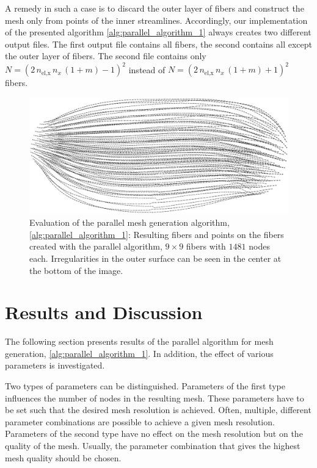 A remedy in such a case is to discard the outer layer of fibers and construct the mesh only from points of the inner streamlines.
Accordingly, our implementation of the presented algorithm \cref{alg:parallel_algorithm_1} always creates two different output files. The first output file contains all fibers, the second contains all except the outer layer of fibers. The second file contains only $N=(2\,n_\text{el,x}\,n_x\,(1+m)-1)^2$ instead of $N=(2\,n_\text{el,x}\,n_x\,(1+m)+1)^2$ fibers.
\begin{figure}%
  \centering%
  \includegraphics[width=\textwidth]{images/parallel_fiber_estimation/poor_boundary_33x33.png}%
  \caption{Evaluation of the parallel mesh generation algorithm, \cref{alg:parallel_algorithm_1}: Resulting fibers and points on the fibers created with the parallel algorithm, $9\times 9$ fibers with $1481$ nodes each. Irregularities in the outer surface can be seen in the  center at the bottom of the image.}%
  \label{fig:poor_boundary_33x33}%
\end{figure}%

\section{Results and Discussion}

The following section presents results of the parallel algorithm for mesh generation, \cref{alg:parallel_algorithm_1}. In addition, the effect of various parameters is investigated.

Two types of parameters can be distinguished. Parameters of the first type influences the number of nodes in the resulting mesh. These parameters have to be set such that the desired mesh resolution is achieved. Often, multiple, different parameter combinations are possible to achieve a given mesh resolution.
Parameters of the second type have no effect on the mesh resolution but on the quality of the mesh. Usually, the parameter combination that gives the highest mesh quality should be chosen.

